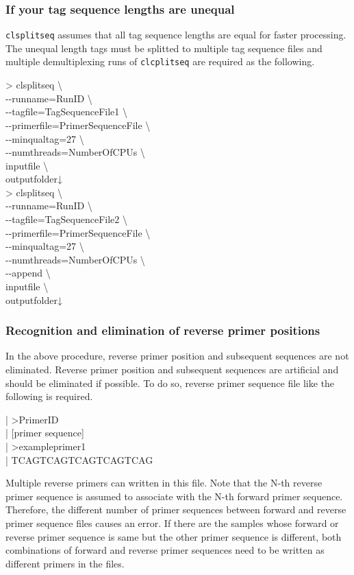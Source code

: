 \documentclass[titlepage,10pt,a4paper,english]{jsbook}
\newenvironment{content}{\begin{shaded}\vspace{-1em}\raggedright\ttfamily\footnotesize\setlength{\baselineskip}{1.4em}}{\end{shaded}\vspace{-1em}}
\newenvironment{cmd}{\begin{oframed}\raggedright\ttfamily\footnotesize\setlength{\baselineskip}{1.4em}}{\end{oframed}\vspace{-1em}}
\begin{document}
\subsubsection{If your tag sequence lengths are unequal}
\texttt{clsplitseq} assumes that all tag sequence lengths are equal for faster processing.
The unequal length tags must be splitted to multiple tag sequence files and multiple demultiplexing runs of \texttt{clcplitseq} are required as the following.
\begin{cmd}
{\textgreater} clsplitseq {\textbackslash}\\
{-}{-}runname=RunID {\textbackslash}\\
{-}{-}tagfile=TagSequenceFile1 {\textbackslash}\\
{-}{-}primerfile=PrimerSequenceFile {\textbackslash}\\
{-}{-}minqualtag=27 {\textbackslash}\\
{-}{-}numthreads=NumberOfCPUs {\textbackslash}\\
inputfile {\textbackslash}\\
outputfolder↓\\
{\textgreater} clsplitseq {\textbackslash}\\
{-}{-}runname=RunID {\textbackslash}\\
{-}{-}tagfile=TagSequenceFile2 {\textbackslash}\\
{-}{-}primerfile=PrimerSequenceFile {\textbackslash}\\
{-}{-}minqualtag=27 {\textbackslash}\\
{-}{-}numthreads=NumberOfCPUs {\textbackslash}\\
{-}{-}append {\textbackslash}\\
inputfile {\textbackslash}\\
outputfolder↓
\end{cmd}

\subsubsection{Recognition and elimination of reverse primer positions}
In the above procedure, reverse primer position and subsequent sequences are not eliminated.
Reverse primer position and subsequent sequences are artificial and should be eliminated if possible.
To do so, reverse primer sequence file like the following is required.
\begin{content}
| {\textgreater}PrimerID\\
| [primer sequence]\\
| {\textgreater}exampleprimer1\\
| TCAGTCAGTCAGTCAGTCAG
\end{content}
Multiple reverse primers can written in this file.
Note that the N-th reverse primer sequence is assumed to associate with the N-th forward primer sequence.
Therefore, the different number of primer sequences between forward and reverse primer sequence files causes an error.
If there are the samples whose forward or reverse primer sequence is same but the other primer sequence is different, both combinations of forward and reverse primer sequences need to be written as different primers in the files.
\end{document}
